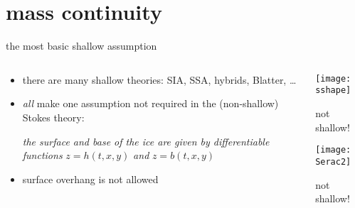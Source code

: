 
\section{mass continuity}

\begin{frame}{the most basic shallow assumption}

\begin{columns}

\begin{column}{0.6\textwidth}
\begin{itemize}
\item there are many shallow theories: SIA, SSA, hybrids, Blatter, \dots
\item \emph{all} make one assumption not required in the (non-shallow) Stokes theory:

\begin{center}
\emph{the surface and base of the ice are given by differentiable functions} $z=h(t,x,y)$ \emph{and} $z=b(t,x,y)$
\end{center}
\item surface overhang is not allowed
\end{itemize}
\end{column}

\begin{column}{0.4\textwidth}
\texttt{[image: sshape]}

\scriptsize
\begin{center}
\alert{not shallow!}
\end{center}
\vspace{6mm}

\texttt{[image: Serac2]}

\begin{center}
\alert{not shallow!}
\end{center}
\end{column}
\end{columns}
\end{frame}


